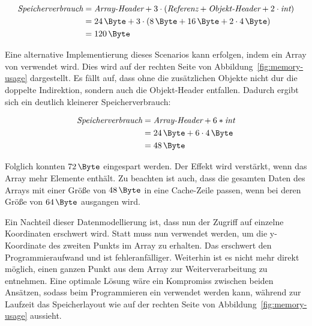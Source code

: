 \begin{equation}
    \begin{split}
        \textit{Speicherverbrauch} & = \textit{Array-Header} + 3 \cdot (\textit{Referenz} + \textit{Objekt-Header} + 2 \cdot \textit{int}) \\
        & = \SI{24}{\Byte} + 3 \cdot (\SI{8}{\Byte} + \SI{16}{\Byte} + 2 \cdot \SI{4}{\Byte}) \\
        & = \SI{120}{\Byte}\label{eq:memory-usage-current} \\
    \end{split}
\end{equation}

Eine alternative Implementierung dieses Scenarios kann erfolgen, indem ein Array von  verwendet wird.
Dies wird auf der rechten Seite von Abbildung~\ref{fig:memory-usage} dargestellt.
Es fällt auf, dass ohne die zusätzlichen Objekte nicht dur die doppelte Indirektion, sondern auch die Objekt-Header entfallen.
Dadurch ergibt sich ein deutlich kleinerer Speicherverbrauch:

\begin{equation}
    \begin{split}
        \textit{Speicherverbrauch} & = \textit{Array-Header} + 6 * \textit{int} \\
        & = \SI{24}{\Byte} + 6 \cdot \SI{4}{\Byte} \\
        & = \SI{48}{\Byte}\label{eq:memory-usage-flat}
    \end{split}
\end{equation}

Folglich konnten $\SI{72}{\Byte}$ eingespart werden.
Der Effekt wird verstärkt, wenn das Array mehr Elemente enthält.
Zu beachten ist auch, dass die gesamten Daten des Arrays mit einer Größe von $\SI{48}{\Byte}$ in eine Cache-Zeile passen, wenn bei deren Größe von $\SI{64}{\Byte}$ ausgangen wird.

Ein Nachteil dieser Datenmodellierung ist, dass nun der Zugriff auf einzelne Koordinaten erschwert wird.
Statt  muss nun  verwendet werden, um die y-Koordinate des zweiten Punkts im Array zu erhalten.
Das erschwert den Programmieraufwand und ist fehleranfälliger.
Weiterhin ist es nicht mehr direkt möglich, einen ganzen Punkt aus dem Array zur Weiterverarbeitung zu entnehmen.
Eine optimale Lösung wäre ein Kompromiss zwischen beiden Ansätzen, sodass beim Programmieren ein  verwendet werden kann, während zur Laufzeit das Speicherlayout wie auf der rechten Seite von Abbildung~\ref{fig:memory-usage} aussieht.

